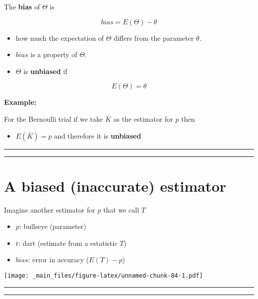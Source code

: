 \documentclass[
]{book}
\providecommand{\tightlist}{%
  \setlength{\itemsep}{0pt}\setlength{\parskip}{0pt}}
\begin{document}
The \textbf{bias} of \(\Theta\) is

\[bias=E(\Theta)-\theta\]

\begin{itemize}
\item
  how much the expectation of \(\Theta\) differs from the parameter \(\theta\).
\item
  \(bias\) is a property of \(\Theta\).
\item
  \(\Theta\) is \textbf{unbiased} if
\end{itemize}

\[E(\Theta)=\theta\]

\textbf{Example:}

For the Bernoulli trial if we take \(\bar{K}\) as the estimator for \(p\) then

\begin{itemize}
\tightlist
\item
  \(E(\bar{K})=p\) and therefore it is \textbf{unbiased}
\end{itemize}

\begin{center}\rule{0.5\linewidth}{0.5pt}\end{center}

\begin{center}\rule{0.5\linewidth}{0.5pt}\end{center}

\hypertarget{a-biased-inaccurate-estimator}{%
\section{A biased (inaccurate) estimator}\label{a-biased-inaccurate-estimator}}

Imagine another estimator for \(p\) that we call \(T\)

\begin{itemize}
\tightlist
\item
  \(p\): bullseye (parameter)
\item
  \(t\): dart (estimate from a estatistic \(T\))
\item
  \(bias\): error in accuracy (\(E(T)-p\))
\end{itemize}

\texttt{[image: \_main\_files/figure-latex/unnamed-chunk-84-1.pdf]}

\begin{center}\rule{0.5\linewidth}{0.5pt}\end{center}

\begin{center}\rule{0.5\linewidth}{0.5pt}\end{center}
\end{document}
